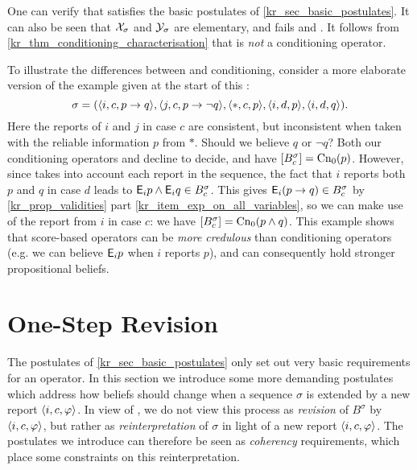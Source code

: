 One can verify that \scorebasedop{} satisfies the basic postulates of
\cref{kr_sec_basic_postulates}. It can also be seen that $\mathcal{X}_\sigma$ and
$\mathcal{Y}_\sigma$ are elementary, and \scorebasedop{} fails \duprem{} and \incvac{}.
It follows from
\cref{kr_thm_conditioning_characterisation} that \scorebasedop{} is \emph{not} a
conditioning operator.\footnotemark{}


\begin{example}
\label{kr_ex_score_based}
     To illustrate the differences between \scorebasedop{} and conditioning,
     consider a more elaborate version of the
     example given at the start of this :
     \[
        \sigma = (
            \langle {i, c, p \to q} \rangle,
            \langle {j, c, p \to\neg q} \rangle,
            \langle {\ast, c, p} \rangle,
            \langle {i, d, p} \rangle,
            \langle {i, d, q} \rangle
        ).
     \]
     Here the reports of $i$ and $j$ in case $c$ are consistent,
     but inconsistent when taken with
     the reliable information $p$ from $\ast$. Should we believe $q$ or $\neg
     q$? Both our conditioning operators \varbasedcond{} and \partbasedcond{}
     decline to decide, and have $\left[{B^\sigma_c}\right] = \operatorname{Cn}_0(p)$. However,
     since \scorebasedop{} takes into account each report in the
     sequence, the fact that $i$ reports both $p$ and $q$ in case $d$ leads to
     $\mathsf{E}_i{p} \land \mathsf{E}_i{q} \in B^\sigma_c$. This gives $\mathsf{E}_i(p \to q)
     \in B^\sigma_c$ by \cref{kr_prop_validities} part
     \cref{kr_item_exp_on_all_variables}, so we can make use of the report
     from $i$ in case $c$: we have $\left[{B^\sigma_c}\right] = \operatorname{Cn}_0(p \land
     q)$.
     This example shows that score-based operators can be \emph{more credulous}
     than conditioning operators (e.g. we can believe $\mathsf{E}_i{p}$ when
     $i$ reports $p$), and can consequently hold stronger propositional
     beliefs.

\end{example}

\section{One-Step Revision}
\label{kr_sec_one_step_postulates}

The postulates of \cref{kr_sec_basic_postulates} only set out very basic
requirements for an operator. In this section we introduce some more demanding
postulates which address how beliefs should change when a sequence $\sigma$ is
extended by a new report $\langle {i, c, \varphi} \rangle$.  In view of \rearr{}, we do not
view this process as \emph{revision} of $B^\sigma$ by $\langle {i, c, \varphi} \rangle$, but
rather as \emph{reinterpretation} of $\sigma$ in light of a new report
$\langle {i, c, \varphi} \rangle$. The postulates we introduce can therefore be seen as
\emph{coherency} requirements, which place some constraints on this
reinterpretation.

